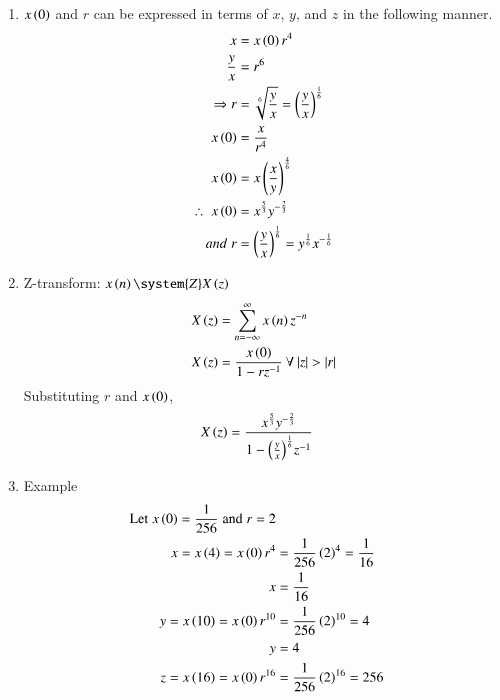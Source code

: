 \documentclass[journal,12pt,twocolumn]{IEEEtran}
\theoremstyle{remark}
\begin{document}
\begin{enumerate}
															 \item
															 $x\left(0\right)$ and $r$ can be expressed in terms of $x$, $y$, and $z$ in the following manner.
															 \begin{align}
															        x&=x\left(0\right)r^4 \\
																    \frac{y}{x}&=r^6 \\
																     \Rightarrow r&=\sqrt[6]{\frac{y}{x}}=\left(\frac{y}{x}\right)^{\frac{1}{6}}\\
																         x\left(0\right)&=\frac{x}{r^4}\\
																	     x\left(0\right)&=x\left(\frac{x}{y}\right)^{\frac{4}{6}}\\
																	      \therefore\; x\left(0\right)&=x^{\frac{5}{3}}y^{-\frac{2}{3}} \\
																	       and\; r&=\left(\frac{y}{x}\right)^{\frac{1}{6}}= y^{\frac{1}{6}}x^{-\frac{1}{6}}
																	       \end{align}
																	       \item 
																	       Z-transform:    $x\brak{n} \system{Z} X\brak{z}$
																	       \begin{align}
																	           X\brak{z}&= \sum_{n=-\infty}^{\infty} x\brak{n}z^{-n}\\
																		       X\brak{z}&=\dfrac{x\brak{0}}{1-rz^{-1}}\: \forall\: |z|>|r|
																		       \end{align}
																		       Substituting $r$ and $x\left(0\right)$, 
																		       \begin{align}
																		            X\left(z\right)&=\dfrac{x^{\frac{5}{3}}y^{-\frac{2}{3}}}{1-{\left(\frac{y}{x}\right)^{\frac{1}{6}}}z^{-1}}
																			    \end{align}
																			    \item Example 
																			    \begin{align}
																			        \notag\text{Let}\;x\brak{0} =\dfrac{1}{256}\;\text{and}\;r = 2\\     \notag x=x\brak{4}=x\brak{0}r^4 &=\frac{1}{256}\brak{2}^4=\frac{1}{16}\\
																				     x&=\frac{1}{16} \\
																				         y=x\brak{10}=x\brak{0}r^{10} &=\frac{1}{256}\brak{2}^{10}=4\\
																					     \notag y&=4 \\
																					         z=x\brak{16}=x\brak{0}r^{16} &=\frac{1}{256}\brak{2}^{16}=256\\

\end{align}
\end{enumerate}
\end{document}

